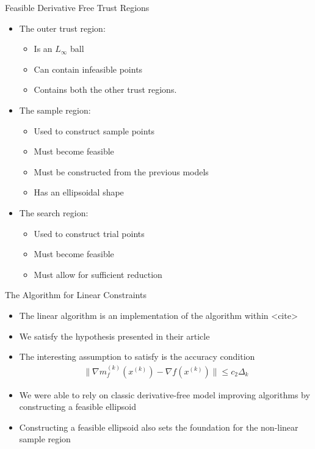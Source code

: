 \documentclass{beamer}
\begin{document}
\begin{frame}{Feasible Derivative Free Trust Regions}
	\begin{itemize}
		\item The outer trust region:
			\begin{itemize}
				\item Is an $L_{\infty}$ ball
				\item Can contain infeasible points
				\item Contains both the other trust regions.
			\end{itemize}
		\item The sample region:
			\begin{itemize}
				\item Used to construct sample points
				\item Must become feasible
				\item Must be constructed from the previous models
				\item Has an ellipsoidal shape
			\end{itemize}
		\item The search region:
			\begin{itemize}
				\item Used to construct trial points
				\item Must become feasible
				\item Must allow for sufficient reduction
			\end{itemize}
	\end{itemize}
\end{frame}


\begin{frame}{The Algorithm for Linear Constraints}
	\begin{itemize}
		\item The linear algorithm is an implementation of the algorithm within <cite>
		\item We satisfy the hypothesis presented in their article
		\item The interesting assumption to satisfy is the accuracy condition
\begin{align*}
		\|\nabla m_f^{(k)}(x^{(k)}) - \nabla f (x^{(k)})\| \le c_2 \Delta_k
\end{align*}
		\item We were able to rely on classic derivative-free model improving algorithms
		by constructing a feasible ellipsoid
		\item Constructing a feasible ellipsoid also sets the foundation for the non-linear sample region
	\end{itemize}
\end{frame}
\end{document}
